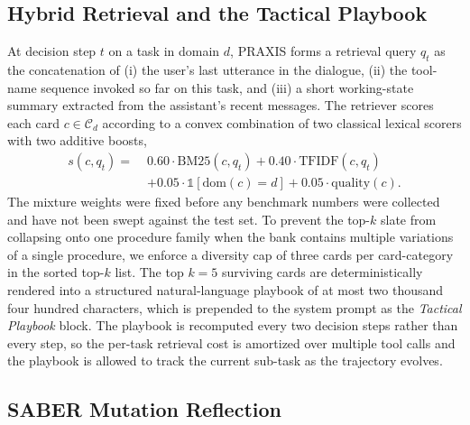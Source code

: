\documentclass[conference]{IEEEtran}
\begin{document}
\subsection{Hybrid Retrieval and the Tactical Playbook}

At decision step $t$ on a task in domain $d$, PRAXIS forms a
retrieval query $q_t$ as the concatenation of (i) the user's last
utterance in the dialogue, (ii) the tool-name sequence invoked so
far on this task, and (iii) a short working-state summary
extracted from the assistant's recent messages. The retriever
scores each card $c \in \mathcal{C}_d$ according to a convex
combination of two classical lexical scorers with two additive
boosts,
\begin{equation}
\label{eq:score}
\begin{aligned}
s(c, q_t) = \;& 0.60 \cdot \mathrm{BM25}(c, q_t)
              + 0.40 \cdot \mathrm{TFIDF}(c, q_t) \\
              & + 0.05 \cdot \mathbb{1}[\mathrm{dom}(c) = d]
              + 0.05 \cdot \mathrm{quality}(c).
\end{aligned}
\end{equation}
The mixture weights were fixed before any benchmark numbers were
collected and have not been swept against the test set. To prevent
the top-$k$ slate from collapsing onto one procedure family when
the bank contains multiple variations of a single procedure, we
enforce a diversity cap of three cards per card-category in the
sorted top-$k$ list. The top $k = 5$ surviving cards are
deterministically rendered into a structured natural-language
playbook of at most two thousand four hundred characters, which is
prepended to the system prompt as the \emph{Tactical Playbook}
block. The playbook is recomputed every two decision steps rather
than every step, so the per-task retrieval cost is amortized over
multiple tool calls and the playbook is allowed to track the
current sub-task as the trajectory evolves.

\subsection{SABER Mutation Reflection}\label{sec:saber}
\end{document}
